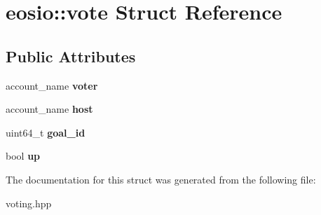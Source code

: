 \hypertarget{structeosio_1_1vote}{}\section{eosio\+:\+:vote Struct Reference}
\label{structeosio_1_1vote}
\subsection*{Public Attributes}
\begin{DoxyCompactItemize}
\item 
\mbox{\label{structeosio_1_1vote_a6bdea781cbcc39dde9d7fc46a548968c}} 
account\+\_\+name {\bfseries voter}
\item 
\mbox{\label{structeosio_1_1vote_ac683ded160c11a294e1720fda5a62b03}} 
account\+\_\+name {\bfseries host}
\item 
\mbox{\label{structeosio_1_1vote_ac17320874168bcbfdb4db58dd6e3ba82}} 
uint64\+\_\+t {\bfseries goal\+\_\+id}
\item 
\mbox{\label{structeosio_1_1vote_a28b87c515530fa005cbbcdd3d868b683}} 
bool {\bfseries up}
\end{DoxyCompactItemize}


The documentation for this struct was generated from the following file\+:\begin{DoxyCompactItemize}
\item 
voting.\+hpp\end{DoxyCompactItemize}
